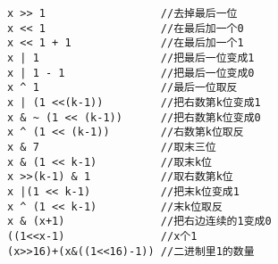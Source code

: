 \begin{lstlisting}
x >> 1                  //去掉最后一位
x << 1                  //在最后加一个0 
x << 1 + 1              //在最后加一个1  
x | 1                   //把最后一位变成1 
x | 1 - 1               //把最后一位变成0  
x ^ 1                   //最后一位取反  
x | (1 <<(k-1))         //把右数第k位变成1  
x & ~ (1 << (k-1))      //把右数第k位变成0
x ^ (1 << (k-1))        //右数第k位取反  
x & 7                   //取末三位  
x & (1 << k-1)          //取末k位     
x >>(k-1) & 1           //取右数第k位 
x |(1 << k-1)           //把末k位变成1  
x ^ (1 << k-1)          //末k位取反    
x & (x+1)               //把右边连续的1变成0  
((1<<x-1)               //x个1
(x>>16)+(x&((1<<16)-1)) //二进制里1的数量
\end{lstlisting}